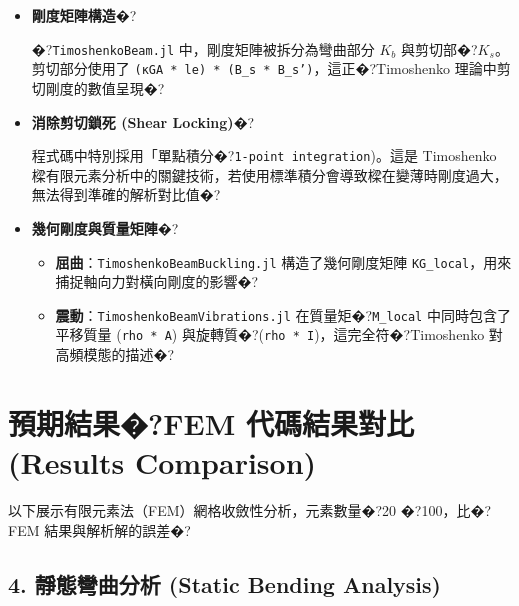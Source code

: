 \documentclass[UTF8, a4paper, 12pt]{ctexart}
\begin{document}
\begin{itemize}

    \item \textbf{剛度矩陣構造}�?

    �?\texttt{TimoshenkoBeam.jl} 中，剛度矩陣被拆分為彎曲部分 $K_b$ 與剪切部�?$K_s$。剪切部分使用了 \texttt{(κGA * le) * (B\_s * B\_s')}，這正�?Timoshenko 理論中剪切剛度的數值呈現�?

    

    \item \textbf{消除剪切鎖死 (Shear Locking)}�?

    程式碼中特別採用「單點積分�?\texttt{1-point integration})。這是 Timoshenko 樑有限元素分析中的關鍵技術，若使用標準積分會導致樑在變薄時剛度過大，無法得到準確的解析對比值�?

    

    \item \textbf{幾何剛度與質量矩陣}�?

    \begin{itemize}

        \item \textbf{屈曲}：\texttt{TimoshenkoBeamBuckling.jl} 構造了幾何剛度矩陣 \texttt{KG\_local}，用來捕捉軸向力對橫向剛度的影響�?

        \item \textbf{震動}：\texttt{TimoshenkoBeamVibrations.jl} 在質量矩�?\texttt{M\_local} 中同時包含了平移質量 (\texttt{rho * A}) 與旋轉質�?(\texttt{rho * I})，這完全符�?Timoshenko 對高頻模態的描述�?

    \end{itemize}

\end{itemize}



\section{預期結果�?FEM 代碼結果對比 (Results Comparison)}



以下展示有限元素法（FEM）網格收斂性分析，元素數量�?20 �?100，比�?FEM 結果與解析解的誤差�?



\subsection{4. 靜態彎曲分析 (Static Bending Analysis)}
\end{document}
